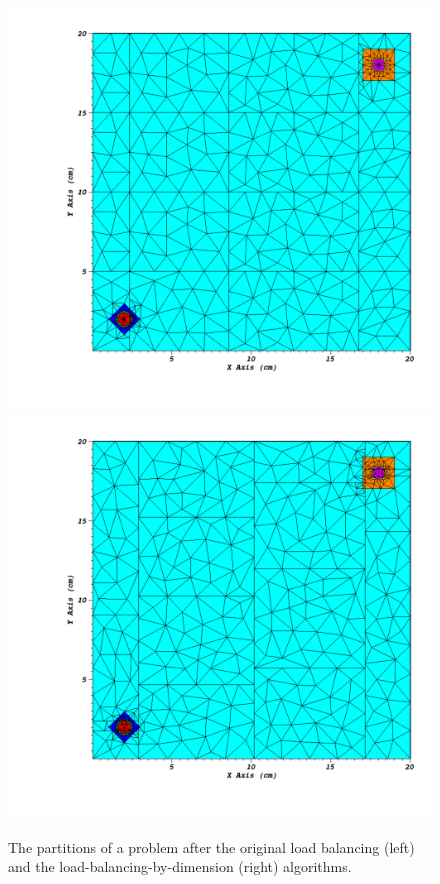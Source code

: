 \begin{figure}[H]
\centering
\includegraphics[scale=0.45,trim={0.95in 0.64in 0.35in 0.44in},clip]{../figures/og_lb_example.pdf}
\includegraphics[scale=0.45,trim={0.95in 0.64in 0.35in 0.44in},clip]{../figures/lbd_example.pdf}
\caption{The partitions of a problem after the original load balancing (left) and the load-balancing-by-dimension (right) algorithms.}
\label{alg_illustration}
\end{figure}


